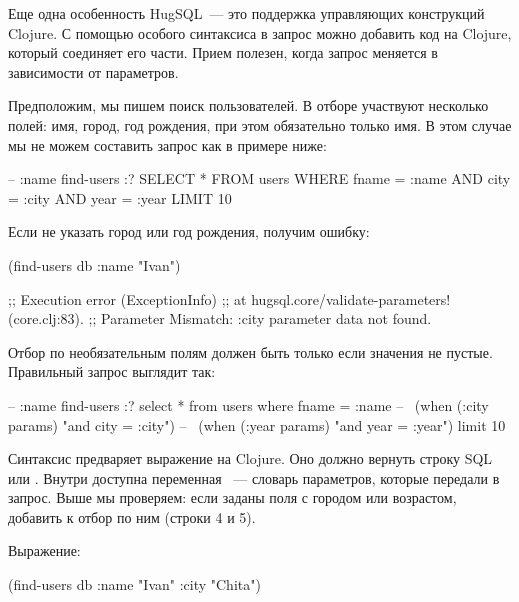 Еще одна особенность HugSQL~--- это поддержка управляющих конструкций Clojure. С помощью особого синтаксиса в запрос можно добавить код на Clojure, который соединяет его части. Прием полезен, когда запрос меняется в зависимости от параметров.

Предположим, мы пишем поиск пользователей. В отборе участвуют несколько полей: имя, город, год рождения, при этом обязательно только имя. В этом случае мы не можем составить запрос как в примере ниже:

\begin{english}
  \begin{sql}
-- :name find-users :?
SELECT * FROM users
WHERE fname = :name
  AND city = :city
  AND year = :year
LIMIT 10
  \end{sql}
\end{english}

Если не указать город или год рождения, получим ошибку:

\begin{english}
  \begin{clojure}
(find-users db {:name "Ivan"})

;; Execution error (ExceptionInfo)
;; at hugsql.core/validate-parameters! (core.clj:83).
;; Parameter Mismatch: :city parameter data not found.
  \end{clojure}
\end{english}

Отбор по необязательным полям должен быть только если значения не пустые. Правильный запрос выглядит так:

\begin{english}
  \begin{sql/lines}
-- :name find-users :?
select * from users
where fname = :name
--~ (when (:city params) "and city = :city")
--~ (when (:year params) "and year = :year")
limit 10
  \end{sql/lines}
\end{english}

Синтаксис \code{-{}-{}\~} предваряет выражение на Clojure. Оно должно вернуть строку SQL или . Внутри доступна переменная ~--- словарь параметров, которые передали в запрос. Выше мы проверяем: если заданы поля с городом или возрастом, добавить к  отбор по ним (строки 4 и 5).

\pagebreaklarge

Выражение:

\begin{english}
  \begin{clojure}
(find-users db {:name "Ivan" :city "Chita"})
  \end{clojure}
\end{english}

